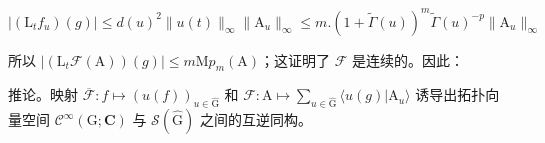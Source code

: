 \[
| (\mathrm{L} _ {t} f _ {u}) (g) | \leq d (u) ^ {2} \| u (t) \| _ {\infty} \| \mathrm{A} _ {u} \| _ {\infty} \leq m. (1 + \tilde {\Gamma} (u)) ^ {m} \tilde {\Gamma} (u) ^ {- p} \| \mathrm{A} _ {u} \| _ {\infty}
\]

所以 \(|(\mathrm{L}_t\mathcal{F}(\mathrm{A}))(g)| \leq m\mathrm{M}p_m(\mathrm{A})\)；这证明了 \(\mathcal{F}\) 是连续的。因此：

推论。映射 \(\overline{\mathcal{F}}: f \mapsto (u(f))_{u \in \hat{\mathrm{G}}} \text{ 和 } \mathcal{F}: \mathrm{A} \mapsto \sum_{u \in \hat{\mathrm{G}}} \langle u(g) | \mathrm{A}_u \rangle\) 诱导出拓扑向量空间 \(\mathcal{C}^\infty(\mathrm{G}; \mathbf{C})\) 与 \(\mathcal{S}(\hat{\mathrm{G}})\) 之间的互逆同构。

